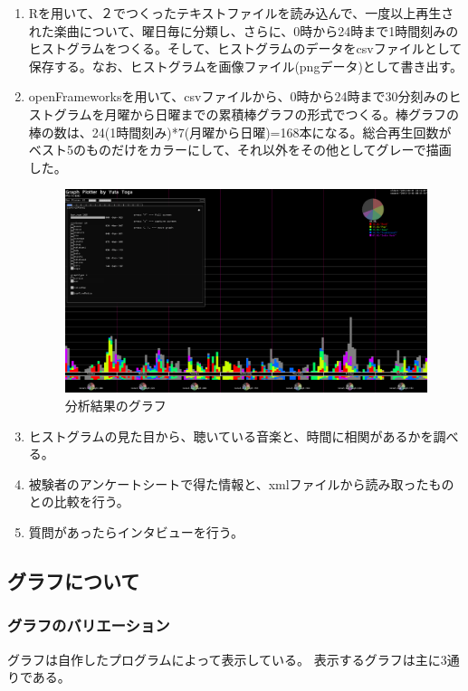 \documentclass{jsarticle}
\begin{document}
\begin{enumerate}
\item
Rを用いて、２でつくったテキストファイルを読み込んで、一度以上再生された楽曲について、曜日毎に分類し、さらに、0時から24時まで1時間刻みのヒストグラムをつくる。そして、ヒストグラムのデータをcsvファイルとして保存する。なお、ヒストグラムを画像ファイル(pngデータ)として書き出す。

\item
openFrameworksを用いて、csvファイルから、0時から24時まで30分刻みのヒストグラムを月曜から日曜までの累積棒グラフの形式でつくる。棒グラフの棒の数は、24(1時間刻み)*7(月曜から日曜)=168本になる。総合再生回数がベスト5のものだけをカラーにして、それ以外をその他としてグレーで描画した。

\begin{figure}
\begin{center}
\includegraphics[width=14cm]{graph_sample.png}
\caption{分析結果のグラフ}
\end{center}
\end{figure}

\item
ヒストグラムの見た目から、聴いている音楽と、時間に相関があるかを調べる。
\item
被験者のアンケートシートで得た情報と、xmlファイルから読み取ったものとの比較を行う。
\item
質問があったらインタビューを行う。

\end{enumerate}
\subsection{グラフについて}
\subsubsection{グラフのバリエーション}
グラフは自作したプログラムによって表示している。
表示するグラフは主に3通りである。
\end{document}
